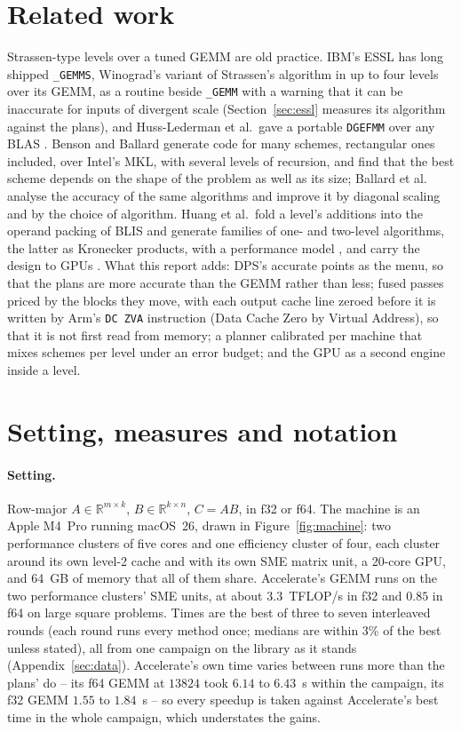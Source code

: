 \documentclass[11pt]{article}
\newcommand{\R}{\mathbb{R}}
\begin{document}
\section{Related work}\label{sec:related}

Strassen-type levels over a tuned GEMM are old practice.  IBM's ESSL has long
shipped \texttt{\_GEMMS}, Winograd's variant of Strassen's algorithm in up to
four levels over its GEMM, as a routine beside \texttt{\_GEMM} with a warning
that it can be inaccurate for inputs of divergent scale \cite{ESSL}
(Section~\ref{sec:essl} measures its algorithm against the plans), and
Huss-Lederman et al.\ gave a portable \texttt{DGEFMM} over any BLAS
\cite{HLJJTT96}.  Benson and Ballard \cite{BB15} generate code for many
schemes, rectangular ones included, over Intel's MKL, with several levels of
recursion, and find that the best scheme depends on the shape of the problem
as well as its size; Ballard et al.\ \cite{BBDLS16} analyse the accuracy of
the same algorithms and improve it by diagonal scaling and by the choice of
algorithm.  Huang et al.\ fold a level's additions into the operand packing
of BLIS \cite{HSvdG16} and generate families of one- and two-level
algorithms, the latter as Kronecker products, with a performance model
\cite{HRMvdG17}, and carry the design to GPUs \cite{HYvdG20}.  What this
report adds: DPS's accurate points as the menu, so that the plans are more
accurate than the GEMM rather than less; fused passes priced by the blocks
they move, with each output cache line zeroed before it is written by Arm's
\texttt{DC~ZVA} instruction (Data Cache Zero by Virtual Address), so that it
is not first read from memory; a planner
calibrated per machine that mixes schemes per level under an error budget;
and the GPU as a second engine inside a level.

\section{Setting, measures and notation}\label{sec:setup}

\paragraph{Setting.}
Row-major $A\in\R^{m\times k}$, $B\in\R^{k\times n}$, $C=AB$, in f32 or f64.
The machine is an Apple M4~Pro running macOS~26, drawn in
Figure~\ref{fig:machine}: two performance clusters of five cores and one
efficiency cluster of four, each cluster around its own level-2 cache and
with its own SME matrix unit, a 20-core GPU, and 64~GB of memory that all of
them share.  Accelerate's GEMM runs on the two performance clusters' SME
units, at about $3.3$~TFLOP/s in f32 and
$0.85$ in f64 on large square problems.  Times are the best of three to
seven interleaved rounds (each round runs every method once; medians are
within 3\% of the best unless stated), all from one campaign on the library
as it stands (Appendix~\ref{sec:data}).  Accelerate's own time varies between
runs more than the plans' do -- its f64 GEMM at $13824$ took $6.14$ to
$6.43$~s within the campaign, its f32 GEMM $1.55$ to $1.84$~s -- so every speedup is taken against
Accelerate's best time in the whole campaign, which understates the gains.
\end{document}
